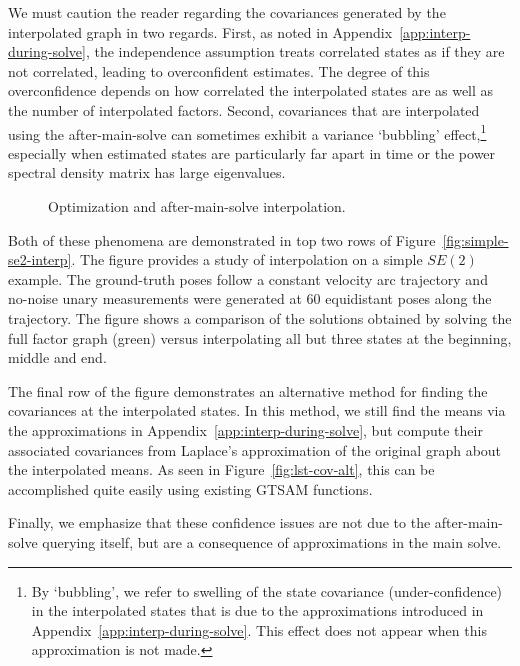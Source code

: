 We must caution the reader regarding the covariances generated by the interpolated graph in two regards. First, as noted in Appendix~\ref{app:interp-during-solve}, the independence assumption treats correlated states as if they are not correlated, leading to overconfident estimates. The degree of this overconfidence depends on how correlated the interpolated states are as well as the number of interpolated factors. Second, covariances that are interpolated using the after-main-solve can sometimes exhibit a variance `bubbling' effect,\footnote{By `bubbling', we refer to swelling of the state covariance (under-confidence) in the interpolated states that is due to the approximations introduced in Appendix~\ref{app:interp-during-solve}. This effect does not appear when this approximation is not made.} especially when estimated states are particularly far apart in time or the power spectral density matrix has large eigenvalues.

\begin{figure}[ht!]
	\centering
	\caption{Optimization and after-main-solve interpolation.}
	\label{fig:lst-optimize}
\end{figure}

Both of these phenomena are demonstrated in top two rows of Figure~\ref{fig:simple-se2-interp}. The figure provides a study of interpolation on a simple $SE(2)$ example. The ground-truth poses follow a constant velocity arc trajectory and no-noise unary measurements were generated at 60 equidistant poses along the trajectory. The figure shows a comparison of the solutions obtained by solving the full factor graph (green) versus interpolating all but three states at the beginning, middle and end. 

The final row of the figure demonstrates an alternative method for finding the covariances at the interpolated states. In this method, we still find the means via the approximations in Appendix~\ref{app:interp-during-solve}, but compute their associated covariances from Laplace's approximation of the original graph about the interpolated means. 
As seen in Figure~\ref{fig:lst-cov-alt}, this can be accomplished quite easily using existing \ac{GTSAM} functions. 

Finally, we emphasize that these confidence issues are not due to the after-main-solve querying itself, but are a consequence of approximations in the main solve.

